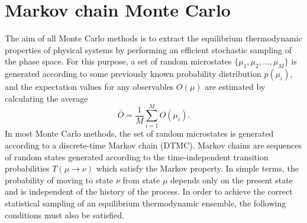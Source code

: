 \documentclass[12pt]{report}
\begin{document}
\section{Markov chain Monte Carlo}
The aim of all Monte Carlo methods is to extract the equilibrium thermodynamic properties of physical systems by performing an efficient stochastic sampling of the phase space. For this purpose, a set of random microstates $\{\mu_{1},\mu_{2},...,\mu_{M}\}$ is generated according to some previously known probability distribution $p(\mu_{i})$, and the expectation values for any observables $O({\mu})$ are estimated by calculating the average
%
\begin{equation}
\label{eq:expectationValue}
\bar{O} = \frac{1}{M}\sum_{i = 1}^{M} O(\mu_{i}).
\end{equation}
%
In most Monte Carlo methods, the set of random microstates is generated according to a discrete-time Markov chain (DTMC). Markov chains are sequences of random states generated according to the time-independent transition probabilities 
$T(\mu \rightarrow \nu)$ which satisfy the Markov property. In simple terms, the probability of moving to state $\nu$ from state $\mu$ depends only on the present state and is independent of the history of the process. In order to achieve the correct statistical sampling of an equilibrium thermodynamic ensemble, the following conditions must also be satisfied.
\end{document}
